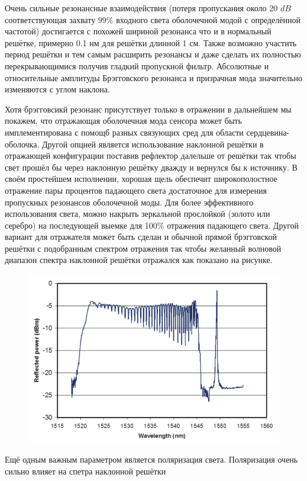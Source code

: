 Очень сильные  резонансные взаимодействия (потеря пропускания около 20 $dB$ соответствующая захвату  $ 99\%   $ входного света оболочечной модой с определённой частотой) достигается с похожей шириной резонанса что и в нормальный решётке, примерно 0.1 нм для решётки длинной 1 см. Также возможно участить период решётки и тем самым расширить резонансы и даже сделать их полностью перекрывающимися получив гладкий пропускной фильтр. Абсолютные и относительные  амплитуды Брэгговского резонанса и призрачная мода значительно изменяются с углом наклона.

\par

Хотя брэгговсикй резонанс присутствует только в отражении в дальнейшем мы покажем, что отражающая оболочечная мода сенсора может быть имплементирована с помощб разных связующих сред для области сердцевина-оболочка. Другой опцией является использование наклонной решётки в отражающей конфигурации поставив рефлектор далельше от решётки так чтобы свет прошёл бы через наклонную решётку дважду и вернулся бы к источнику. В своём простейшем исполнении, хорошая щель обеспечит широкополостное отражение пары процентов падающего света достаточное для измерения пропускных резонансов оболочечной моды. Для более эффективного использования света, можно накрыть зеркальной прослойкой (золото или серебро) на последующей выемке для 100\% отражения падающего света. Другой вариант для отражателя может быть сделан и обычной прямой брэгговской решётки с подобранным спектром отражения так чтобы желанный волновой диапазон спектра наклонной решётки отражался как показано на рисунке.

\begin{figure}
	\centering
	\includegraphics[width=0.7\linewidth]{screenshot007}
	\caption{}
	\label{fig:screenshot007}
\end{figure}

\par 
Ещё одным важным параметром является поляризация света. Поляризация очень сильно влияет на спетра наклонной решётки